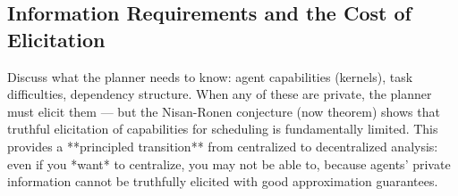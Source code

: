\subsection{Information Requirements and the Cost of Elicitation}
Discuss what the planner needs to know: agent capabilities (kernels), task difficulties, dependency structure. When any of these are private, the planner must elicit them — but the Nisan-Ronen conjecture (now theorem) shows that truthful elicitation of capabilities for scheduling is fundamentally limited. This provides a **principled transition** from centralized to decentralized analysis: even if you *want* to centralize, you may not be able to, because agents' private information cannot be truthfully elicited with good approximation guarantees.
